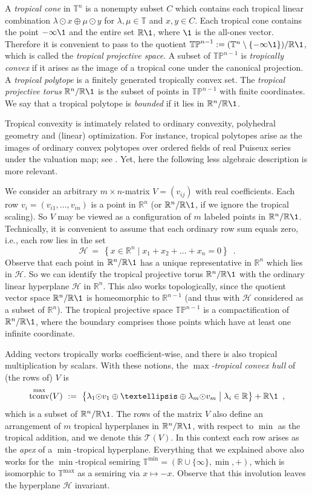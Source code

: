\documentclass[a4paper,12pt]{amsart}
\newcommand\PP{{\mathbb P}}
\newcommand\RR{{\mathbb R}}
\newcommand\TT{{\mathbb T}}
\newcommand\cH{{\mathcal H}}
\newcommand\cT{{\mathcal T}}
\newcommand\SetOf[2]{\left\{#1 \mid #2\right\}}
\newcommand\bigSetOf[2]{\bigl\{#1 \bigm| #2\bigr\}}
\newcommand\torus[1]{\RR^{#1}/\RR\1} %
\newcommand\TTmax{\TT^{\max}}
\newcommand\TTmin{\TT^{\min}}
\newcommand\TP{{\TT\PP}}
\DeclareMathOperator\tconv{tconv}
\theoremstyle{remark}
\begin{document}
A \emph{tropical cone} in $\TT^n$ is a nonempty subset $C$ which contains each tropical linear combination $\lambda {\odot} x \oplus \mu {\odot} y$ for $\lambda,\mu\in\TT$ and $x,y\in C$.
Each tropical cone contains the point $-\infty\1$ and the entire set $\RR\1$, where $\1$ is the all-ones vector.
Therefore it is convenient to pass to the quotient $\TP^{n-1}:=(\TT^n\setminus\{-\infty\1\})/\RR\1$, which is called the \emph{tropical projective space}.
A subset of $\TP^{n-1}$ is \emph{tropically convex} if it arises as the image of a tropical cone under the canonical projection.
A \emph{tropical polytope} is a finitely generated tropically convex set.
The \emph{tropical projective torus} $\torus{n}$ is the subset of points in $\TP^{n-1}$ with finite coordinates.
We say that a tropical polytope is \emph{bounded} if it lies in $\torus{n}$.

Tropical convexity is intimately related to ordinary convexity, polyhedral geometry and (linear) optimization.
For instance, tropical polytopes arise as the images of ordinary convex polytopes over ordered fields of real Puiseux series under the valuation map; see \cite[Observation~5.10]{ETC}.
Yet, here the following less algebraic description is more relevant.

We consider an arbitrary $m{\times}n$-matrix $V=(v_{ij})$ with real coefficients.
Each row $v_i=(v_{i1},\dots,v_{in})$ is a point in $\RR^n$ (or $\torus{n}$, if we ignore the tropical scaling).
So $V$ may be viewed as a configuration of $m$ labeled points in $\torus{n}$.
Technically, it is convenient to assume that each ordinary row sum equals zero, i.e., each row lies in the set
\[
  \cH \ = \ \SetOf{x\in\RR^n}{x_1+x_2+\dots+x_n=0} \enspace.
\]
Observe that each point in $\torus{n}$ has a unique representative in $\RR^n$ which lies in $\cH$.
So we can identify the tropical projective torus $\torus{n}$ with the ordinary linear hyperplane $\cH$ in $\RR^n$.
This also works topologically, since the quotient vector space $\torus{n}$ is homeomorphic to $\RR^{n-1}$ (and thus with $\cH$ considered as a subset of $\RR^n$).
The tropical projective space $\TP^{n-1}$ is a compactification of $\torus{n}$, where the boundary comprises those points which have at least one infinite coordinate.

Adding vectors tropically works coefficient-wise, and there is also tropical multiplication by scalars.
With these notions, the \emph{$\max$-tropical convex hull} of (the rows of) $V$ is
\[
  \tconv^{\max}(V) \ := \ \bigSetOf{ \lambda_1{\odot} v_1 \oplus \dots \oplus \lambda_m{\odot}v_m}{\lambda_i\in\RR} + \RR\1 \enspace,
\]
which is a subset of $\torus{n}$.
The rows of the matrix $V$ also define an arrangement of $m$ tropical hyperplanes in $\torus{n}$, with respect to $\min$ as the tropical addition, and we denote this $\cT(V)$.
In this context each row arises as the \emph{apex} of a $\min$-tropical hyperplane.
Everything that we explained above also works for the $\min$-tropical semiring $\TTmin=(\RR\cup\{\infty\},\min,+)$, which is isomorphic to $\TTmax$ as a semiring via $x\mapsto -x$.
Observe that this involution leaves the hyperplane $\cH$ invariant.
\end{document}
